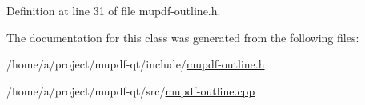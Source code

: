 Definition at line 31 of file mupdf-\/outline.\-h.



The documentation for this class was generated from the following files\-:\begin{DoxyCompactItemize}
\item 
/home/a/project/mupdf-\/qt/include/\hyperlink{mupdf-outline_8h}{mupdf-\/outline.\-h}\item 
/home/a/project/mupdf-\/qt/src/\hyperlink{mupdf-outline_8cpp}{mupdf-\/outline.\-cpp}\end{DoxyCompactItemize}
